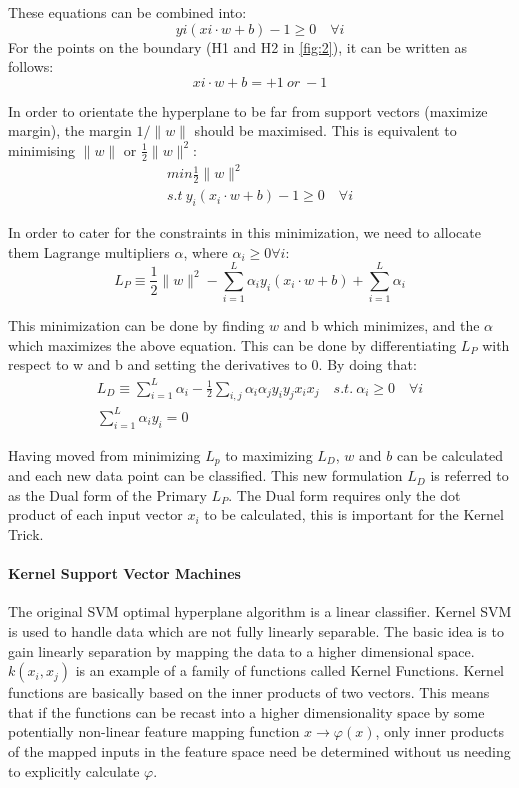 \documentclass[letterpaper,10pt]{article}
\theoremstyle{mytheor}
\begin{document}
These equations can be combined into:
\begin{equation}
yi (xi \cdot w + b) - 1 \geq 0 \quad \forall i
\end{equation}
For the points on the boundary (H1 and H2 in \ref{fig:2}), it can be written as follows:
\begin{equation}
xi \cdot w + b = +1\ or\ -1  
\end{equation}

In order to orientate the hyperplane to be far from support vectors (maximize margin), the margin $1/\|w\|$   should be maximised. This is equivalent to minimising $\|w\|$ or $\frac{1}{2}\|w\|^{2}$:
\begin{gather}
min \frac{1}{2} \|w\|^{2} \\ 
s.t\  y_i (x_i \cdot w + b) -1 \geq 0 \quad \forall i
\end{gather}

In order to cater for the constraints in this minimization, we need to allocate them Lagrange multipliers $\alpha$, where $\alpha_{i} \geq 0 \forall i$:
\begin{equation}
L_P \equiv \frac{1}{2} \|w\|^{2} - \sum^{L}_{i=1}  \alpha_{i}y_i (x_i \cdot w + b) + \sum^{L}_{i=1} \alpha_{i}
\end{equation}

This minimization can be done by finding $w$ and b which minimizes, and the $\alpha$ which maximizes the above equation. This can be done by differentiating $L_P$ with respect to  w and b and setting the derivatives to 0. By doing that:
\begin{gather}
L_D \equiv \sum^{L}_{i=1} \alpha_{i} - \frac{1}{2} \sum_{i,j} \alpha_{i}\alpha_{j}y_i y_j x_i x_j \quad s.t.\ \alpha_{i} \geq 0 \quad \forall i \\
\sum^{L}_{i=1}  \alpha_{i}y_i = 0  
\end{gather}

Having moved from minimizing $L_p$ to maximizing $L_D$, $w$ and $b$ can be calculated and each new data point can be classified. This new formulation $L_D$ is referred to as the Dual form of the Primary $L_P$. The Dual form requires only the dot product of each input vector $x_i$ to be calculated, this is important for the Kernel Trick.
\paragraph{Kernel Support Vector Machines}
The original SVM optimal hyperplane algorithm is a linear classifier. Kernel SVM is used to handle data which are not fully linearly separable. The basic idea is to gain linearly separation by mapping the data to a higher dimensional space. $k(x_i, x_j)$ is an example of a family of functions called Kernel Functions. Kernel functions are basically based on the inner products of two vectors. This means that if the functions can be recast into a higher dimensionality space by some potentially non-linear feature mapping function $x \rightarrow \varphi(x)$, only inner products of the mapped inputs in the feature space need be determined without us needing to explicitly calculate $\varphi$.
\end{document}
